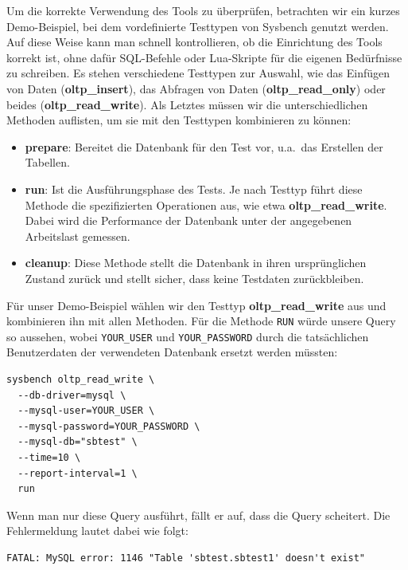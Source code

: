 Um die korrekte Verwendung des Tools zu überprüfen, betrachten wir ein kurzes Demo-Beispiel, bei dem vordefinierte Testtypen von Sysbench genutzt werden.
Auf diese Weise kann man schnell kontrollieren, ob die Einrichtung des Tools korrekt ist, ohne dafür SQL-Befehle oder Lua-Skripte für die eigenen Bedürfnisse zu schreiben.
Es stehen verschiedene Testtypen zur Auswahl, wie das Einfügen von Daten (\textbf{oltp\_insert}), das Abfragen von Daten (\textbf{oltp\_read\_only}) oder beides (\textbf{oltp\_read\_write}).
Als Letztes müssen wir die unterschiedlichen Methoden auflisten, um sie mit den Testtypen kombinieren zu können:

\begin{itemize}
    \setlength{\itemsep}{-3pt}
    \item \textbf{prepare}: Bereitet die Datenbank für den Test vor, u.a.\ das Erstellen der Tabellen.
    \item \textbf{run}: Ist die Ausführungsphase des Tests.
    Je nach Testtyp führt diese Methode die spezifizierten Operationen aus, wie etwa \textbf{oltp\_read\_write}.
    Dabei wird die Performance der Datenbank unter der angegebenen Arbeitslast gemessen.
    \item \textbf{cleanup}: Diese Methode stellt die Datenbank in ihren ursprünglichen Zustand zurück und stellt sicher, dass keine Testdaten zurückbleiben.
\end{itemize}

Für unser Demo-Beispiel wählen wir den Testtyp \textbf{oltp\_read\_write} aus und kombinieren ihn mit allen Methoden.
Für die Methode \texttt{RUN} würde unsere Query so aussehen, wobei \texttt{YOUR\_USER} und \texttt{YOUR\_PASSWORD} durch die tatsächlichen Benutzerdaten der verwendeten Datenbank ersetzt werden müssten:

\vspace{-5pt}
\begin{lstlisting}[style=custom_daniel,label={lst:sysbenchrun}]
sysbench oltp_read_write \
  --db-driver=mysql \
  --mysql-user=YOUR_USER \
  --mysql-password=YOUR_PASSWORD \
  --mysql-db="sbtest" \
  --time=10 \
  --report-interval=1 \
  run
\end{lstlisting}
\vspace{-5pt}

Wenn man nur diese Query ausführt, fällt er auf, dass die Query scheitert.
Die Fehlermeldung lautet dabei wie folgt:

\begin{lstlisting}[style=custom_daniel,label={lst:error_withoutprepare}]
FATAL: MySQL error: 1146 "Table 'sbtest.sbtest1' doesn't exist"
\end{lstlisting}

